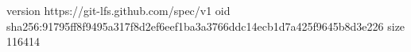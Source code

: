 version https://git-lfs.github.com/spec/v1
oid sha256:91795ff8f9495a317f8d2ef6eef1ba3a3766ddc14ecb1d7a425f9645b8d3e226
size 116414
